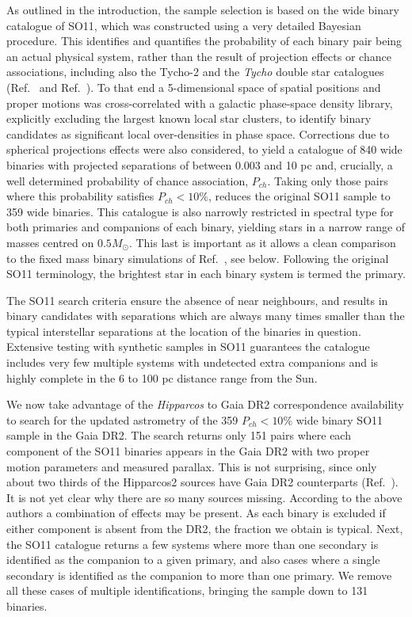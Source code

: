 \documentclass{ws-ijmpd}
\begin{document}
As outlined in the introduction, the sample selection is based on the wide binary catalogue of SO11,
which was constructed using a very detailed Bayesian procedure. This identifies and quantifies the probability of each binary pair
being an actual physical system, rather than the result of projection effects or chance associations, including also the
Tycho-2 and the {\it Tycho} double star catalogues (Ref.~ and Ref.~). To that end a 5-dimensional
space of spatial positions and proper motions was cross-correlated with a galactic phase-space density library, { explicitly
excluding the largest known local star clusters}, to identify binary candidates as significant local over-densities in phase
space. Corrections due to spherical projections effects were also considered, to yield a catalogue of 840 wide binaries with projected
separations of between 0.003 and 10 pc and, crucially, a well determined probability of chance association, $P_{ch}$. Taking only those
pairs where this probability satisfies $P_{ch}<10 \%$, reduces the original SO11 sample to 359 wide binaries. This catalogue is also
narrowly restricted in spectral type for both primaries and companions of each binary, yielding stars in a narrow range of masses centred
on $0.5 M_{\odot}$. This last is important as it allows a clean comparison to the fixed mass binary simulations of Ref.~,
see below. Following the original SO11 terminology, the brightest star in each binary system is termed the primary.

The SO11 search criteria ensure the absence of near neighbours, and results in binary candidates with separations
which are always many times smaller than the typical interstellar separations at the location of the binaries in question. 
Extensive testing with synthetic samples in SO11 guarantees the catalogue includes very few multiple systems with
undetected extra companions and is highly complete in the 6 to 100 pc distance range from the Sun.

We now take advantage of the {\it Hipparcos} to Gaia DR2 correspondence availability to search for the updated astrometry of
the 359 $P_{ch}<10\%$ wide binary SO11 sample in the Gaia DR2. The search returns only 151 pairs where each component
of the SO11 binaries appears in the Gaia DR2 with two proper motion parameters and measured parallax.
This is not surprising, since only about two thirds of the Hipparcos2 sources have
Gaia DR2 counterparts (Ref.~). It is not yet clear why there are so many
sources missing. According to the above authors a combination of effects may be
present. As each binary is excluded if either component is absent from the DR2, the fraction we obtain is typical.
Next, the SO11 catalogue returns a few systems where more than one secondary is identified as the companion to a given
primary, and also cases where a single secondary is identified as the companion to more than one primary. We remove all these
cases of multiple identifications, bringing the sample down to 131 binaries. 
	
\end{document}
